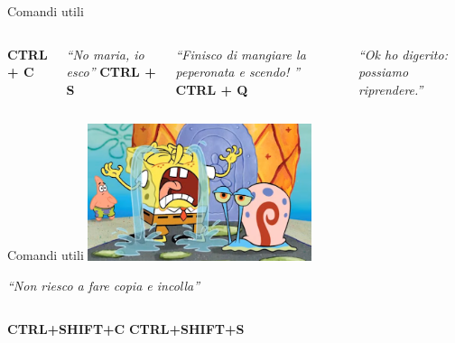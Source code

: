 \documentclass{beamer}
\begin{document}
    \begin{frame}{Comandi utili}
        \begin{columns}[t, onlytextwidth]
                \centering
                \Huge \textbf{CTRL + C}
                
                \vspace{0.2cm}
                
                \normalsize \textit{``No maria, io esco''}
                \centering
                \Huge \textbf{CTRL + S}

                \vspace{0.2cm}

                \normalsize \textit{``Finisco di mangiare la peperonata e scendo! ''}
                \centering
                \Huge \textbf{CTRL + Q}

                \vspace{0.2cm}

                \normalsize \textit{``Ok ho digerito: possiamo riprendere.''}
        \end{columns}
    \end{frame}

    \begin{frame}{Comandi utili}
        \centering
        \includegraphics[height=4cm,keepaspectratio]{images/spongebob-crying.png}

        \Large \textit{``Non riesco a fare copia e incolla''}
        
        \vspace{1cm}

        \begin{columns}[t, onlytextwidth]
                \centering
                \huge \textbf{CTRL+SHIFT+C}
                \centering
                \huge \textbf{CTRL+SHIFT+S}
        \end{columns}
    \end{frame}
\end{document}

